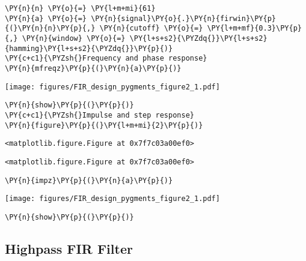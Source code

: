 \documentclass[a4paper,11pt,final]{article}
\begin{document}
\begin{Verbatim}[commandchars=\\\{\},frame=single,fontsize=\small, xleftmargin=0.5em]
\PY{n}{n} \PY{o}{=} \PY{l+m+mi}{61}
\PY{n}{a} \PY{o}{=} \PY{n}{signal}\PY{o}{.}\PY{n}{firwin}\PY{p}{(}\PY{n}{n}\PY{p}{,} \PY{n}{cutoff} \PY{o}{=} \PY{l+m+mf}{0.3}\PY{p}{,} \PY{n}{window} \PY{o}{=} \PY{l+s+s2}{\PYZdq{}}\PY{l+s+s2}{hamming}\PY{l+s+s2}{\PYZdq{}}\PY{p}{)}
\PY{c+c1}{\PYZsh{}Frequency and phase response}
\PY{n}{mfreqz}\PY{p}{(}\PY{n}{a}\PY{p}{)}
\end{Verbatim}
\texttt{[image: figures/FIR\_design\_pygments\_figure2\_1.pdf]}


\begin{Verbatim}[commandchars=\\\{\},frame=single,fontsize=\small, xleftmargin=0.5em]
\PY{n}{show}\PY{p}{(}\PY{p}{)}
\PY{c+c1}{\PYZsh{}Impulse and step response}
\PY{n}{figure}\PY{p}{(}\PY{l+m+mi}{2}\PY{p}{)}
\end{Verbatim}

\begin{Verbatim}[commandchars=\\\{\},frame=leftline,fontsize=\small, xleftmargin=0.5em]
<matplotlib.figure.Figure at 0x7f7c03a00ef0>
\end{Verbatim}

\begin{Verbatim}[commandchars=\\\{\},frame=leftline,fontsize=\small, xleftmargin=0.5em]
<matplotlib.figure.Figure at 0x7f7c03a00ef0>
\end{Verbatim}


\begin{Verbatim}[commandchars=\\\{\},frame=single,fontsize=\small, xleftmargin=0.5em]
\PY{n}{impz}\PY{p}{(}\PY{n}{a}\PY{p}{)}
\end{Verbatim}
\texttt{[image: figures/FIR\_design\_pygments\_figure2\_1.pdf]}


\begin{Verbatim}[commandchars=\\\{\},frame=single,fontsize=\small, xleftmargin=0.5em]
\PY{n}{show}\PY{p}{(}\PY{p}{)}
\end{Verbatim}


\subsection{Highpass FIR Filter}
\end{document}
